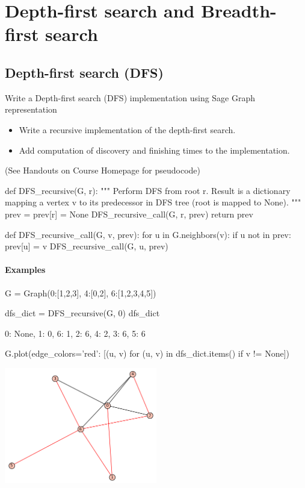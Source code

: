 \chapter{Depth-first search and Breadth-first search}

\section{Depth-first search (DFS)}

Write a Depth-first search (DFS) implementation using Sage Graph representation
\begin{itemize}
  \item Write a recursive implementation of the depth-first search.
  \item Add computation of discovery and finishing times to the implementation.
\end{itemize}
(See Handouts on Course Homepage for pseudocode)

\medskip
\begin{sageCell}
def DFS_recursive(G, r):
    """
    Perform DFS from root r. Result is a dictionary mapping a vertex v to
    its predecessor in DFS tree (root is mapped to None).
    """
    prev = {}
    prev[r] = None
    DFS_recursive_call(G, r, prev)
    return prev

def DFS_recursive_call(G, v, prev):
    for u in G.neighbors(v):
        if u not in prev:
            prev[u] = v
            DFS_recursive_call(G, u, prev)
\end{sageCell}

\subsubsection*{Examples}

\begin{sageCell}
   G = Graph({0:[1,2,3], 4:[0,2], 6:[1,2,3,4,5]})

   dfs_dict = DFS_recursive(G, 0)
   dfs_dict
\end{sageCell}
\begin{outCell}
   {0: None, 1: 0, 6: 1, 2: 6, 4: 2, 3: 6, 5: 6}
\end{outCell}

\begin{sageCell}
   G.plot(edge_colors={'red': [(u, v) for (u, v) in dfs_dict.items() if v != None]})
\end{sageCell}
\begin{outImage}
   \includegraphics[width=0.5\textwidth]{Images/DFS/dfs_tree.png}
\end{outImage}


